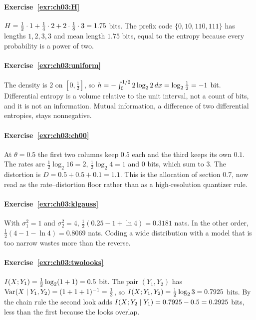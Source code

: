 
\paragraph{Exercise~\ref{exr:ch03:H}}
$H=\frac12\cdot1+\frac14\cdot2+2\cdot\frac18\cdot3=1.75$ bits. The prefix code $\{0,10,110,111\}$ has lengths $1,2,3,3$ and mean length $1.75$ bits, equal to the entropy because every probability is a power of two.

\paragraph{Exercise~\ref{exr:ch03:uniform}}
The density is $2$ on $[0,\frac12]$, so $h=-\int_0^{1/2}2\log_2 2\,dx=\log_2\frac12=-1$ bit. Differential entropy is a volume relative to the unit interval, not a count of bits, and it is not an information. Mutual information, a difference of two differential entropies, stays nonnegative.

\paragraph{Exercise~\ref{exr:ch03:ch00}}
At $\theta=0.5$ the first two columns keep $0.5$ each and the third keeps its own $0.1$. The rates are $\frac12\log_2 16=2$, $\frac12\log_2 4=1$ and $0$ bits, which sum to $3$. The distortion is $D=0.5+0.5+0.1=1.1$. This is the allocation of section 0.7, now read as the rate--distortion floor rather than as a high-resolution quantizer rule.

\paragraph{Exercise~\ref{exr:ch03:klgauss}}
With $\sigma_1^2=1$ and $\sigma_2^2=4$, $\frac12(0.25-1+\ln4)=0.3181$ nats. In the other order, $\frac12(4-1-\ln4)=0.8069$ nats. Coding a wide distribution with a model that is too narrow wastes more than the reverse.

\paragraph{Exercise~\ref{exr:ch03:twolooks}}
$I(X;Y_1)=\frac12\log_2(1+1)=0.5$ bit. The pair $(Y_1,Y_2)$ has $\operatorname{Var}(X\mid Y_1,Y_2)=(1+1+1)^{-1}=\frac13$, so $I(X;Y_1,Y_2)=\frac12\log_2 3=0.7925$ bits. By the chain rule the second look adds $I(X;Y_2\mid Y_1)=0.7925-0.5=0.2925$ bits, less than the first because the looks overlap.

